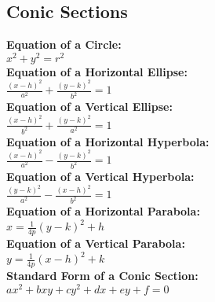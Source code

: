 \documentclass[12pt]{article}
\begin{document}
\subsection*{Conic Sections}
\textbf{Equation of a Circle:}
    \\ \( x^2 + y^2 = r^2 \)
\\ \textbf{Equation of a Horizontal Ellipse:}
    \\ \( \displaystyle\frac{ ( x - h )^2 }{ a^2 } + \displaystyle\frac{ ( y - k )^2 }{ b^2 } = 1 \)
\\ \textbf{Equation of a Vertical Ellipse:}
    \\ \( \displaystyle\frac{ ( x - h )^2 }{ b^2 } + \displaystyle\frac{ ( y - k )^2 }{ a^2 } = 1 \)
\\ \textbf{Equation of a Horizontal Hyperbola:}
    \\ \( \displaystyle\frac{ ( x - h )^2 }{ a^2 } - \displaystyle\frac{ ( y - k )^2 }{ b^2 } = 1 \)
\\ \textbf{Equation of a Vertical Hyperbola:}
    \\ \( \displaystyle\frac{ ( y - k )^2 }{ a^2 } - \displaystyle\frac{ ( x - h )^2 }{ b^2 } = 1 \)
\\ \textbf{Equation of a Horizontal Parabola:}
    \\ \( x = \displaystyle\frac{ 1 }{ 4p } (y - k)^2 +h \)
\\ \textbf{Equation of a Vertical Parabola:}
    \\ \( y = \displaystyle\frac{ 1 }{ 4p } (x - h)^2 +k \)
\\ \textbf{Standard Form of a Conic Section:}
    \\ \( ax^2 + bxy + cy^2 + dx + ey + f = 0 \)
\end{document}
